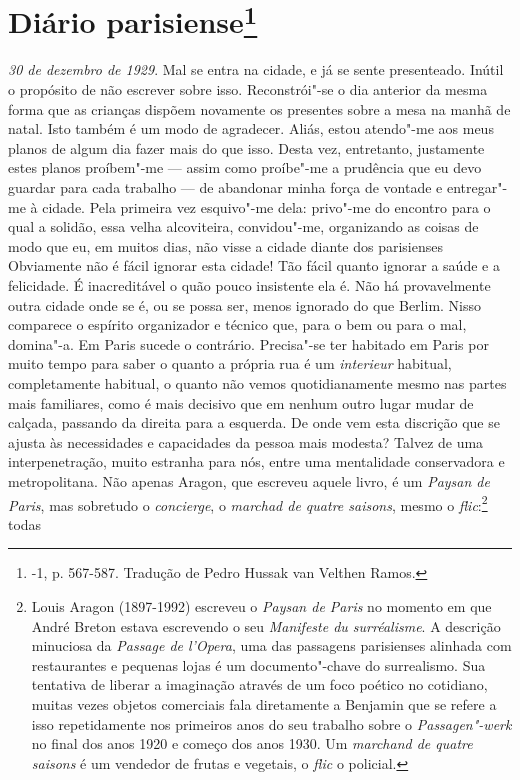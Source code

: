 \chapter{Diário parisiense\footnote[*]{-1, p.
  567-587. Tradução de Pedro Hussak van Velthen Ramos.}}

\emph{30 de dezembro de 1929}. Mal se entra na cidade, e já se sente
presenteado. Inútil o propósito de não escrever sobre isso.
Reconstrói"-se o dia anterior da mesma forma que as crianças dispõem
novamente os presentes sobre a mesa na manhã de natal. Isto também é um
modo de agradecer. Aliás, estou atendo"-me aos meus planos de algum dia
fazer mais do que isso. Desta vez, entretanto, justamente estes planos
proíbem"-me --- assim como proíbe"-me a prudência que eu devo guardar para
cada trabalho --- de abandonar minha força de vontade e entregar"-me à
cidade. Pela primeira vez esquivo"-me dela: privo"-me do encontro para o
qual a solidão, essa velha alcoviteira, convidou"-me, organizando as
coisas de modo que eu, em muitos dias, não visse a cidade diante dos
parisienses Obviamente não é fácil ignorar esta cidade! Tão fácil quanto
ignorar a saúde e a felicidade. É inacreditável o quão pouco insistente
ela é. Não há provavelmente outra cidade onde se é, ou se possa ser,
menos ignorado do que Berlim. Nisso comparece o espírito organizador e
técnico que, para o bem ou para o mal, domina"-a. Em Paris sucede o
contrário. Precisa"-se ter habitado em Paris por muito tempo para saber o
quanto a própria rua é um \emph{interieur} habitual, completamente
habitual, o quanto não vemos quotidianamente mesmo nas partes mais
familiares, como é mais decisivo que em nenhum outro lugar mudar de
calçada, passando da direita para a esquerda. De onde vem esta discrição
que se ajusta às necessidades e capacidades da pessoa mais modesta?
Talvez de uma interpenetração, muito estranha para nós, entre uma
mentalidade conservadora e metropolitana. Não apenas Aragon, que
escreveu aquele livro, é um \emph{Paysan de Paris}, mas sobretudo o
\emph{concierge}, o \emph{marchad de quatre saisons}, mesmo o
\emph{flic}:\footnote{Louis Aragon (1897-1992) escreveu o
  \emph{Paysan de Paris} no momento em que André Breton estava
  escrevendo o seu \emph{Manifeste du surréalisme}. A descrição
  minuciosa da \emph{Passage de l'Opera}, uma das passagens parisienses
  alinhada com restaurantes e pequenas lojas é um documento"-chave do
  surrealismo. Sua tentativa de liberar a imaginação através de um foco
  poético no cotidiano, muitas vezes objetos comerciais fala diretamente
  a Benjamin que se refere a isso repetidamente nos primeiros anos do
  seu trabalho sobre o \emph{Passagen"-werk} no final dos anos 1920 e
  começo dos anos 1930. Um \emph{marchand de quatre saisons} é um
  vendedor de frutas e vegetais, o \emph{flic} o policial. \versal{[N. E.]}} todas
